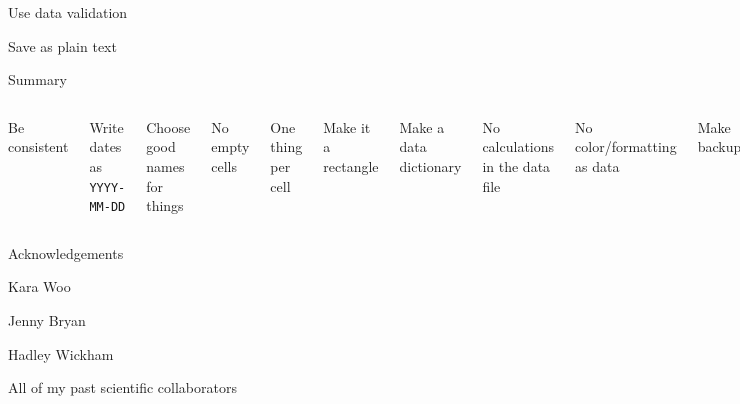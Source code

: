 \documentclass[aspectratio=169,12pt,t]{beamer}
\begin{document}
\begin{frame}[c]{Use data validation}



  \note{
  }
\end{frame}




\begin{frame}[c]{Save as plain text}



  \note{
  }
\end{frame}




\begin{frame}{Summary}

  \begin{columns}


    \bbe
  \item Be consistent
  \item Write dates as {\tt YYYY-MM-DD}
  \item Choose good names for things
  \item No empty cells
  \item One thing per cell
  \item Make it a rectangle
    \ee


    \bbe
    \addtocounter{enumi}{6}
  \item Make a data dictionary
  \item No calculations in the data file
  \item No color/formatting as data
  \item Make backups
  \item Use data validation
  \item Save as plain text
    \ee

    \end{columns}


  \note{

  }

\end{frame}




\begin{frame}{Acknowledgements}


  \bbi
\item[] Kara Woo
\item[] Jenny Bryan
\item[] Hadley Wickham
\item[] All of my past scientific collaborators
  \ei

  \note{
  }

\end{frame}
\end{document}
